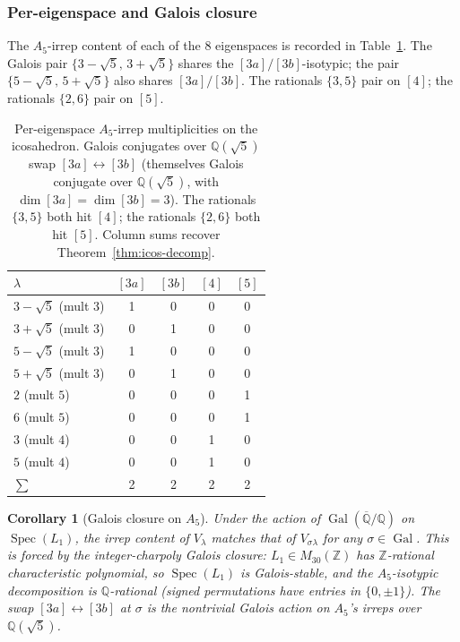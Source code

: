 \documentclass[12pt,a4paper]{article}
\newtheorem{corollary}[theorem]{Corollary}
\theoremstyle{definition}
\theoremstyle{remark}
\newcommand{\bZ}{\mathbb{Z}}
\newcommand{\bQ}{\mathbb{Q}}                %
\DeclareMathOperator{\Gal}{Gal}
\DeclareMathOperator{\Spec}{Spec}
\begin{document}
\subsubsection{Per-eigenspace and Galois closure}\label{sec:icos-per-cluster}

The $A_5$-irrep content of each of the $8$ eigenspaces is recorded in
Table~\ref{tab:icos-per-cluster}. The Galois pair $\{3 - \sqrt 5,\, 3 +
\sqrt 5\}$ shares the $[3a]/[3b]$-isotypic; the pair $\{5 - \sqrt 5,\,
5 + \sqrt 5\}$ also shares $[3a]/[3b]$. The rationals $\{3, 5\}$ pair on
$[4]$; the rationals $\{2, 6\}$ pair on $[5]$.

\begin{table}[H]
\centering
\begin{tabular}{lcccc}
\toprule
$\lambda$ & $[3a]$ & $[3b]$ & $[4]$ & $[5]$ \\
\midrule
$3 - \sqrt 5$ (mult $3$) & 1 & 0 & 0 & 0 \\
$3 + \sqrt 5$ (mult $3$) & 0 & 1 & 0 & 0 \\
$5 - \sqrt 5$ (mult $3$) & 1 & 0 & 0 & 0 \\
$5 + \sqrt 5$ (mult $3$) & 0 & 1 & 0 & 0 \\
$2$ (mult $5$) & 0 & 0 & 0 & 1 \\
$6$ (mult $5$) & 0 & 0 & 0 & 1 \\
$3$ (mult $4$) & 0 & 0 & 1 & 0 \\
$5$ (mult $4$) & 0 & 0 & 1 & 0 \\
\midrule
$\sum$ & 2 & 2 & 2 & 2 \\
\bottomrule
\end{tabular}
\caption{Per-eigenspace $A_5$-irrep multiplicities on the icosahedron.
Galois conjugates over $\bQ(\sqrt 5)$ swap $[3a] \leftrightarrow [3b]$
(themselves Galois conjugate over $\bQ(\sqrt 5)$, with
$\dim [3a] = \dim [3b] = 3$). The rationals
$\{3, 5\}$ both hit $[4]$; the rationals $\{2, 6\}$ both hit $[5]$.
Column sums recover Theorem~\ref{thm:icos-decomp}.}\label{tab:icos-per-cluster}
\end{table}

\begin{corollary}[Galois closure on $A_5$]\label{cor:icos-galois}
Under the action of $\Gal(\overline{\bQ}/\bQ)$ on $\Spec(L_1)$, the irrep
content of $V_\lambda$ matches that of $V_{\sigma\lambda}$ for any
$\sigma \in \Gal$. This is forced by the integer-charpoly Galois closure:
$L_1 \in M_{30}(\bZ)$ has $\bZ$-rational characteristic polynomial, so
$\Spec(L_1)$ is Galois-stable, and the $A_5$-isotypic decomposition is
$\bQ$-rational (signed permutations have entries in $\{0, \pm 1\}$). The
swap $[3a] \leftrightarrow [3b]$ at $\sigma$ is the nontrivial Galois
action on $A_5$'s irreps over $\bQ(\sqrt 5)$.
\end{corollary}
\end{document}
